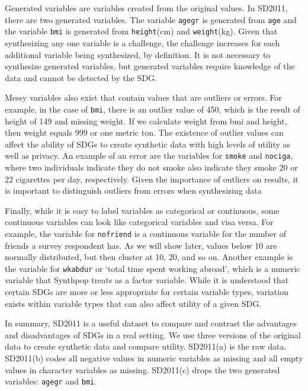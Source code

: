 \documentclass[runningheads]{llncs}
\begin{document}
Generated variables are variables created from the original values.  In SD2011, there are two generated variables.  The variable \texttt{agegr} is generated from \texttt{age} and the variable \texttt{bmi} is generated from \texttt{height}(cm) and \texttt{weight}(kg).  Given that synthesizing any one variable is a challenge, the challenge increases for each additional variable being synthesized, by definition.  It is not necessary to synthesize generated variables, but generated variables require knowledge of the data and cannot be detected by the SDG.  

Messy variables also exist that contain values that are outliers or errors.  For example, in the case of \texttt{bmi}, there is an outlier value of 450, which is the result of height of 149 and missing weight.  If we calculate weight from bmi and height, then weight equals 999 or one metric ton.  The existence of outlier values can affect the ability of SDGs to create synthetic data with high levels of utility as well as privacy.  An example of an error are the variables for \texttt{smoke} and \texttt{nociga}, where two individuals indicate they do not smoke also indicate they smoke 20 or 22 cigarettes per day, respectively.  Given the importance of outliers on results, it is important to distinguish outliers from errors when synthesizing data

Finally, while it is easy to label variables as categorical or continuous, some continuous variables can look like categorical variables and visa versa.  For example, the variable for \texttt{nofriend} is a continuous variable for the number of friends a survey respondent has.  As we will show later, values below 10 are normally distributed, but then cluster at 10, 20, and so on.  Another example is the variable for \texttt{wkabdur} or `total time spent working abroad', which is a numeric variable that Synthpop treats as a factor variable.  While it is understood that certain SDGs are more or less appropriate for certain variable types, variation exists within variable types that can also affect utility of a given SDG. 

In summary, SD2011 is a useful dataset to compare and contrast the advantages and disadvantages of SDGs in a real setting.  We use three versions of the original data to create synthetic data and compare utility.  SD2011(a) is the raw data.  SD2011(b) codes all negative values in numeric variables as missing and all empty values in character variables as missing.  SD2011(c) drops the two generated variables: \texttt{agegr} and \texttt{bmi}.
\end{document}
